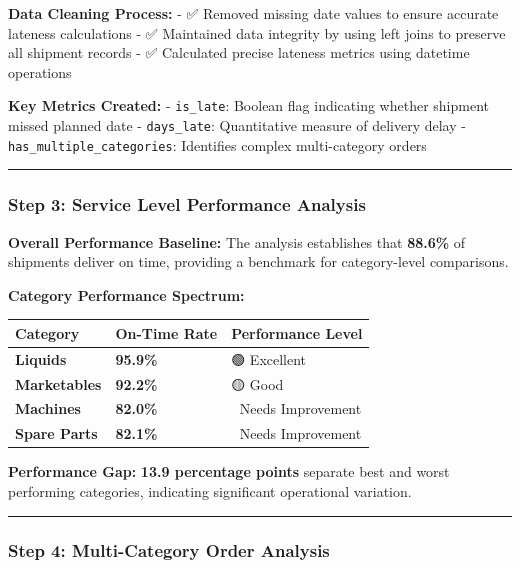 \documentclass[
  letterpaper,
  DIV=11,
  numbers=noendperiod]{scrartcl}
\begin{document}
\textbf{Data Cleaning Process:} - ✅ Removed missing date values to
ensure accurate lateness calculations - ✅ Maintained data integrity by
using left joins to preserve all shipment records - ✅ Calculated
precise lateness metrics using datetime operations

\textbf{Key Metrics Created:} - \texttt{is\_late}: Boolean flag
indicating whether shipment missed planned date - \texttt{days\_late}:
Quantitative measure of delivery delay -
\texttt{has\_multiple\_categories}: Identifies complex multi-category
orders

\begin{center}\rule{0.5\linewidth}{0.5pt}\end{center}

\subsubsection{\texorpdfstring{\textbf{Step 3: Service Level Performance
Analysis}}{Step 3: Service Level Performance Analysis}}\label{step-3-service-level-performance-analysis}

\textbf{Overall Performance Baseline:} The analysis establishes that
\textbf{88.6\%} of shipments deliver on time, providing a benchmark for
category-level comparisons.

\textbf{Category Performance Spectrum:}

\begin{longtable}[]{@{}lll@{}}
\toprule\noalign{}
Category & On-Time Rate & Performance Level \\
\midrule\noalign{}
\endhead
\bottomrule\noalign{}
\endlastfoot
\textbf{Liquids} & \textbf{95.9\%} & 🟢 Excellent \\
\textbf{Marketables} & \textbf{92.2\%} & 🟡 Good \\
\textbf{Machines} & \textbf{82.0\%} & 🔴 Needs Improvement \\
\textbf{Spare Parts} & \textbf{82.1\%} & 🔴 Needs Improvement \\
\end{longtable}

\textbf{Performance Gap:} \textbf{13.9 percentage points} separate best
and worst performing categories, indicating significant operational
variation.

\begin{center}\rule{0.5\linewidth}{0.5pt}\end{center}

\subsubsection{\texorpdfstring{\textbf{Step 4: Multi-Category Order
Analysis}}{Step 4: Multi-Category Order Analysis}}\label{step-4-multi-category-order-analysis}
\end{document}
